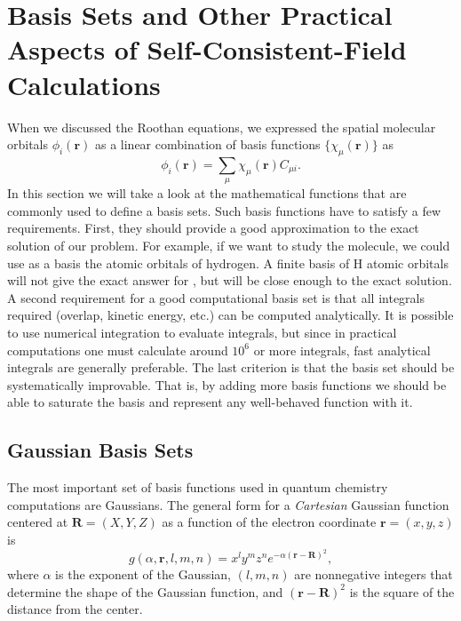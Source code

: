 \documentclass[../Main/chem532-notes.tex]{subfiles}
\begin{document}
\setcounter{chapter}{5}

\chapter{Basis Sets and Other Practical Aspects of Self-Consistent-Field Calculations}

When we discussed the Roothan equations, we expressed the spatial molecular orbitals $\phi_i(\mathbf{r})$ as a linear combination of basis functions $\{ \chi_\mu(\mathbf{r}) \}$ as
\begin{equation}
\phi_i(\mathbf{r}) = \sum_{\mu} \chi_\mu(\mathbf{r}) C_{\mu i}.
\end{equation}
In this section we will take a look at the mathematical functions that are commonly used to define a basis sets.
Such basis functions have to satisfy a few requirements.
First, they should provide a good approximation to the exact solution of our problem. For example, if we want to study the  molecule, we could use as a basis the atomic orbitals of hydrogen. A finite basis of H atomic orbitals will not give the exact answer for , but will be close enough to the exact solution.
A second requirement for a good computational basis set is that all integrals required (overlap, kinetic energy, etc.) can be computed analytically. It is possible to use numerical integration to evaluate integrals, but since in practical computations one must calculate around $10^6$ or more integrals, fast analytical integrals are generally preferable.
The last criterion is that the basis set should be systematically improvable. That is, by adding more basis functions we should be able to saturate the basis and represent any well-behaved function with it.






\section{Gaussian Basis Sets}
The most important set of basis functions used in quantum chemistry computations are Gaussians. The general form for a \textit{Cartesian} Gaussian function centered at $\mathbf{R} = (X,Y,Z)$ as a function of the electron coordinate $\mathbf{r} = (x,y,z)$ is
\begin{equation}
g(\alpha, \mathbf{r}, l, m, n) = x^l y^m z^n e^{-\alpha (\mathbf{r}- \mathbf{R})^2},
\end{equation}
where $\alpha$ is the exponent of the Gaussian, $(l,m,n)$ are nonnegative integers that determine the shape of the Gaussian function, and $(\mathbf{r}- \mathbf{R})^2$ is the square of the distance from the center.
\end{document}
